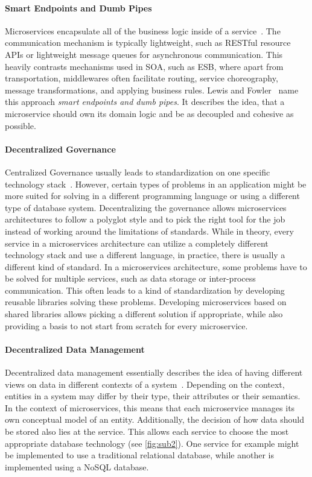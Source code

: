 \paragraph{Smart Endpoints and Dumb Pipes}

Microservices encapsulate all of the business logic inside of a service~\cite{Lewis2014}.
The communication mechanism is typically lightweight, such as \ac{REST}ful resource \acp{API} or lightweight message queues for asynchronous communication.
This heavily contrasts mechanisms used in \ac{SOA}, such as \ac{ESB}, where apart from transportation, middlewares often facilitate routing, service choreography, message transformations, and applying business rules.
Lewis and Fowler~\cite{Lewis2014} name this approach \textit{smart endpoints and dumb pipes}.
It describes the idea, that a microservice should own its domain logic and be as decoupled and cohesive as possible.

\paragraph{Decentralized Governance}

Centralized Governance usually leads to standardization on one specific technology stack~\cite{Lewis2014}.
However, certain types of problems in an application might be more suited for solving in a different programming language or using a different type of database system.
Decentralizing the governance allows microservices architectures to follow a polyglot style and to pick the right tool for the job instead of working around the limitations of standards.
While in theory, every service in a microservices architecture can utilize a completely different technology stack and use a different language, in practice, there is usually a different kind of standard.
In a microservices architecture, some problems have to be solved for multiple services, such as data storage or inter-process communication.
This often leads to a kind of standardization by developing reusable libraries solving these problems.
Developing microservices based on shared libraries allows picking a different solution if appropriate, while also providing a basis to not start from scratch for every microservice.


\paragraph{Decentralized Data Management}

Decentralized data management essentially describes the idea of having different views on data in different contexts of a system~\cite{Lewis2014, Balalaie2016, Taibi2020}.
Depending on the context, entities in a system may differ by their type, their attributes or their semantics.
In the context of microservices, this means that each microservice manages its own conceptual model of an entity.
Additionally, the decision of how data should be stored also lies at the service.
This allows each service to choose the most appropriate database technology (see \autoref{fig:sub2}).
One service for example might be implemented to use a traditional relational database, while another is implemented using a NoSQL database.

